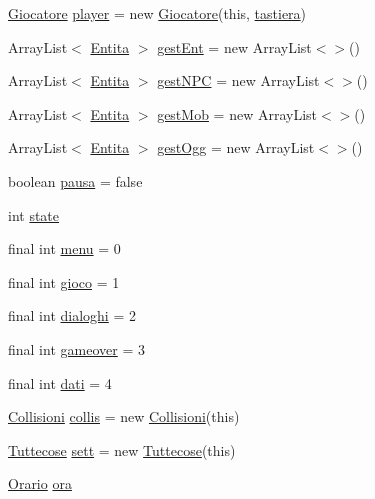 \begin{DoxyCompactItemize}
\item 
\hyperlink{class_entita_1_1_giocatore}{Giocatore} \hyperlink{classa_1_1survival_1_1game_1_1_pannello_a9d7f848831c53565ece98aa720fef0be}{player} = new \hyperlink{class_entita_1_1_giocatore}{Giocatore}(this, \hyperlink{classa_1_1survival_1_1game_1_1_pannello_aa81b2ff7f225716affd276a1fff16da7}{tastiera})
\item 
Array\+List$<$ \hyperlink{class_entita_1_1_entita}{Entita} $>$ \hyperlink{classa_1_1survival_1_1game_1_1_pannello_aadff08c4da8149167797dcb1d4c002b2}{gest\+Ent} = new Array\+List$<$$>$()
\item 
Array\+List$<$ \hyperlink{class_entita_1_1_entita}{Entita} $>$ \hyperlink{classa_1_1survival_1_1game_1_1_pannello_ac61970e82173552b43a93881ba83a5ba}{gest\+N\+PC} = new Array\+List$<$$>$()
\item 
Array\+List$<$ \hyperlink{class_entita_1_1_entita}{Entita} $>$ \hyperlink{classa_1_1survival_1_1game_1_1_pannello_a6230af9e0e0b3961faec989890df6e0b}{gest\+Mob} = new Array\+List$<$$>$()
\item 
Array\+List$<$ \hyperlink{class_entita_1_1_entita}{Entita} $>$ \hyperlink{classa_1_1survival_1_1game_1_1_pannello_a3b9d86a976e15cc8573437bb1072fb4f}{gest\+Ogg} = new Array\+List$<$$>$()
\item 
boolean \hyperlink{classa_1_1survival_1_1game_1_1_pannello_ae6f093cf66923883b189846396dc0088}{pausa} = false
\item 
int \hyperlink{classa_1_1survival_1_1game_1_1_pannello_a89f234133d3efe315836311cbf21c64b}{state}
\item 
final int \hyperlink{classa_1_1survival_1_1game_1_1_pannello_a1c03bce570322e5c42099db2b257aec0}{menu} = 0
\item 
final int \hyperlink{classa_1_1survival_1_1game_1_1_pannello_a4a341629506aeb33ef77492890162cce}{gioco} = 1
\item 
final int \hyperlink{classa_1_1survival_1_1game_1_1_pannello_a378b11e479e2f3101abe4b48f024ae50}{dialoghi} = 2
\item 
final int \hyperlink{classa_1_1survival_1_1game_1_1_pannello_a9c21caf52c4f3bfeb8b074c16f5775a4}{gameover} = 3
\item 
final int \hyperlink{classa_1_1survival_1_1game_1_1_pannello_af1028ebda0895c215e64643e94360eee}{dati} = 4
\item 
\hyperlink{classa_1_1survival_1_1game_1_1_collisioni}{Collisioni} \hyperlink{classa_1_1survival_1_1game_1_1_pannello_a4bccfc668ecd412a507c9c227ac1db42}{collis} = new \hyperlink{classa_1_1survival_1_1game_1_1_collisioni}{Collisioni}(this)
\item 
\hyperlink{classa_1_1survival_1_1game_1_1_tuttecose}{Tuttecose} \hyperlink{classa_1_1survival_1_1game_1_1_pannello_aa932d862196f83ce306903d6feb35b9b}{sett} = new \hyperlink{classa_1_1survival_1_1game_1_1_tuttecose}{Tuttecose}(this)
\item 
\hyperlink{classa_1_1survival_1_1game_1_1_orario}{Orario} \hyperlink{classa_1_1survival_1_1game_1_1_pannello_a74824477a3f77bce08a4ec9db0b0600c}{ora}
\end{DoxyCompactItemize}


